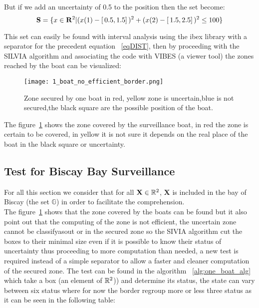But if we add an uncertainty of 0.5 to the position then the set become:
\begin{equation}
 \mathbf{S} = \{ x \in \mathbf{R}^{\textnormal{\ensuremath{2}}} | (x(1)-[ \,0.5,1.5] \,)^{\textnormal{\ensuremath{2}}} + (x(2)-[ \,1.5,2.5] \,)^{\textnormal{\ensuremath{2}}} \leq 100 \}  \label{eqDISTTHICK}
 \end{equation}

This set can easily be found with interval analysis using the ibex library with a separator for the precedent equation ~\eqref{eqDIST}, then by proceeding with the SILVIA algorithm and associating the code with VIBES (a viewer tool) the zones reached by the boat can be visualized:

\begin{figure}[H]
\centering
    \texttt{[image: 1\_boat\_no\_efficient\_border.png]}
    \caption{Zone secured by one boat in red, yellow zone is uncertain,blue is not secured,the black square are the possible position of the boat.}
    \label{fig:SecureZoneOneBoat}
\end{figure}

The figure~\ref{fig:SecureZoneOneBoat} shows the zone covered by the surveillance boat, in red the zone is certain to be covered, in yellow it is not sure it depends on the real place of the boat in the black square or uncertainty.

\subsection{Test for Biscay Bay Surveillance}
For all this section we consider that for all $\mathbf{X} \in \mathbb{R^{\textnormal{\ensuremath{2}}}}$,  $\mathbf{X}$ is included in the bay of Biscay (the set $\mathbb{G}$) in order to facilitate the comprehension.\\
The figure~\ref{fig:SecureZoneOneBoat} shows that the zone covered by the boats can be found but it also point out that the computing of the zone is not efficient, the uncertain zone cannot be classifyasout or in the secured zone so the SIVIA algorithm cut the boxes to their minimal size even if it is possible to know their status of uncertainty thus proceeding to more computation than needed, a new test is required instead of a simple separator to allow a faster and cleaner computation of the secured zone.
The test can be found in the algorithm ~\ref{alg:one_boat_alg} which take a box (an element of $\mathbb{R}^{\textnormal{\ensuremath{2}}}$)) and determine its status, the state can vary between six status where for now the border regroup more or less three status as it can be seen in the following table:

